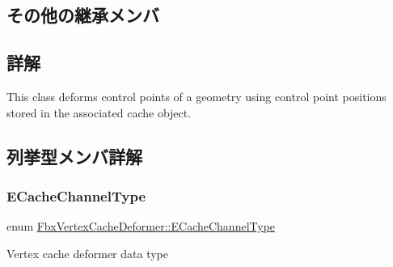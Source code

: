\subsection*{その他の継承メンバ}


\subsection{詳解}
This class deforms control points of a geometry using control point positions stored in the associated cache object. 

\subsection{列挙型メンバ詳解}
\mbox{\label{class_fbx_vertex_cache_deformer_a24f0c46d4f47717615852a8e7346efed}} 
\subsubsection{\texorpdfstring{E\+Cache\+Channel\+Type}{ECacheChannelType}}
{\footnotesize\ttfamily enum \hyperlink{class_fbx_vertex_cache_deformer_a24f0c46d4f47717615852a8e7346efed}{Fbx\+Vertex\+Cache\+Deformer\+::\+E\+Cache\+Channel\+Type}}



Vertex cache deformer data type 

